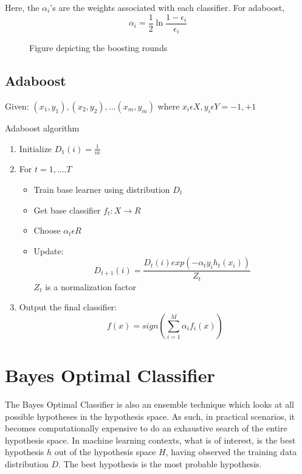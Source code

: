 \documentclass{acmtog} %
\begin{document}
Here, the $\alpha _i$'s are the weights associated with each classifier. For adaboost, 
\begin{equation}
	\alpha _i = \frac{1}{2} \ln{\frac{1 - \epsilon _i}{\epsilon _i}}
\label{eq:boostingAlphaEq}
\end{equation}

\begin{figure}
	\centering
	\def\svgwidth{\columnwidth}
	
	\caption{Figure depicting the boosting rounds}
\end{figure}

\subsection{Adaboost}
Given: $(x_1, y_1), (x_2, y_2),...(x_m, y_m)$ where $x_i \epsilon X, y_i \epsilon Y = {-1, +1}$ 
\begin{algorithm}
	\caption{Adaboost algorithm}
	\begin{enumerate}
		\item Initialize $D_1(i) = \frac{1}{m}$
		\item For $t = 1, .... T$
			\begin{itemize}
				\item Train base learner using distribution $D_t$
				\item Get base classifier $f_t : X \longrightarrow R$
				\item Choose $\alpha _t \epsilon R$
				\item Update: 
					\begin{equation}
						D_{t+1}(i) = \frac{D_t(i) exp(-\alpha _t y_i h_t(x_i))}{Z_t}
					\end{equation}
					$Z_t$ is a normalization factor 
			\end{itemize}
		\item Output the final classifier:
			\begin{equation}
				f(x) = sign(\sum^M_{i=1} \alpha _i f_i(x))
				\label{eq:boostingEq2}
			\end{equation}
	\end{enumerate}
\end{algorithm}
\section{Bayes Optimal Classifier}
The Bayes Optimal Classifier is also an ensemble technique which looks at all possible hypotheses in the hypothesis space. As such, in practical scenarios, it becomes computationally expensive to do an exhaustive search of the entire hypothesis space. In machine learning contexts, what is of interest, is the best hypothesis $h$ out of the hypothesis space $H$, having observed the training data distribution $D$. The best hypothesis is the most probable hypothesis.
\end{document}
